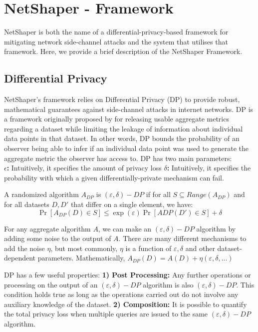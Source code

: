 \section{NetShaper - Framework}
\label{sec:netshaper-framework-bg}

NetShaper \cite{sabzi2024netshaper} is both the name of a differential-privacy-based framework for mitigating network side-channel attacks and the system that utilises that framework. 
Here, we provide a brief description of the NetShaper Framework.

\subsection{Differential Privacy}
NetShaper's framework relies on Differential Privacy (DP) to provide robust, mathematical guarantees against side-channel attacks in internet networks.
DP is a framework originally proposed by \citeauthor{dwork2006differential} for releasing usable aggregate metrics regarding a dataset while limiting the leakage of information about individual data points in that dataset.
In other words, DP bounds the probability of an observer being able to infer if an individual data point was used to generate the aggregate metric the observer has access to.
DP has two main parameters: \\
\textbf{$\epsilon$: } Intuitively, it specifies the amount of privacy loss
\textbf{$\delta$: } Intuitively, it specifies the probability with which a given differentially-private mechanism can fail.


\begin{definition}
  \label{def:dp}
  A randomized algorithm $A_{DP}$ is $(\varepsilon, \delta)-DP$ if for all ${S} \subseteq Range(A_{DP})$ and for all datasets $D, D'$ that differ on a single element, we have:
  \begin{equation*}
    \Pr[A_{DP}(D) \in S] \leq \exp(\varepsilon)\Pr[A{DP}(D') \in S] + \delta
  \end{equation*}
\end{definition}

For any aggregate algorithm $A$, we can make an $(\varepsilon, \delta)-DP$ algorithm by adding some noise to the output of $A$.
There are many different mechanisms to add the noise $\eta$, but most commonly, $\eta$ is a function of $\varepsilon, \delta$ and other dataset-dependent parameters. 
Mathematically, $A_{DP}(D) = A(D) + \eta(\varepsilon, \delta, ...)$

DP has a few useful properties: 
\textbf{1) Post Processing:} Any further operations or processing on the output of an $(\varepsilon, \delta)-DP$ algorithm is also $(\varepsilon, \delta)-DP$.
This condition holds true as long as the operations carried out do not involve any auxiliary knowledge of the dataset.
\textbf{2) Composition:} It is possible to quantify the total privacy loss when multiple queries are issued to the same $(\varepsilon, \delta)-DP$ algorithm.


